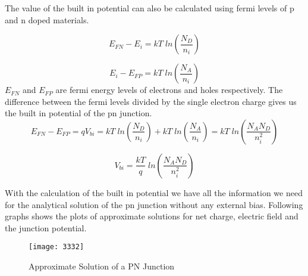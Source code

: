 The value of the built in potential can also be calculated using fermi levels of p and n doped materials.

\begin{equation}
E_{FN}-E_{i}=kT \; ln(\frac{N_{D}}{n_i})
\end{equation}

\begin{equation}
E_{i}-E_{FP}=kT \; ln(\frac{N_{A}}{n_i})
\end{equation}
$E_{FN}$ and $E_{FP}$ are fermi energy levels of electrons and holes respectively. The difference between the fermi levels divided by the single electron charge gives us the built in potential of the pn junction.
\begin{equation}
E_{FN}-E_{FP}=q V_{bi}=kT \; ln(\frac{N_{D}}{n_i})+kT \; ln(\frac{N_{A}}{n_i})=kT \; ln(\frac{N_{A}N_{D}}{n_i^2})
\end{equation}

\begin{equation}
V_{bi}=\frac{kT}{q} \; ln(\frac{N_{A}N_{D}}{n_i^2})
\end{equation}

With the calculation of the built in potential we have all the information we need for the analytical solution of the pn junction without any external bias. Following graphs shows the plots of approximate solutions for net charge, electric field and the junction potential.



\begin{figure}
\centering
\texttt{[image: 3332]}
\caption{Approximate Solution of a PN Junction} 
\end{figure}



